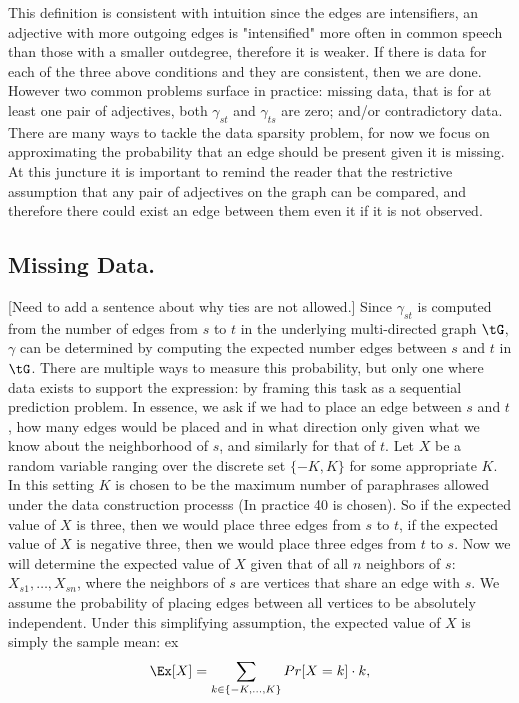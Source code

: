 This definition is consistent with intuition since the edges are intensifiers, an adjective with more outgoing edges is "intensified" more often in common speech than those with a smaller outdegree, therefore it is weaker. If there is data for each of the three above conditions and they are consistent, then we are done. However two common problems surface in practice: missing data, that is for at least one pair of adjectives, both $\gamma_{st}$ and $\gamma_{ts}$ are zero; and/or contradictory data. There are many ways to tackle the data sparsity problem, for now we focus on approximating the probability that an edge should be present given it is missing. At this juncture it is important to remind the reader that the restrictive assumption that any pair of adjectives on the graph can be compared, and therefore there could exist an edge between them even it if it is not observed.

\subsection{Missing Data.}

[Need to add a sentence about why ties are not allowed.] Since $\gamma_{st}$ is computed from the number of edges from $s$ to $t$ in the underlying multi-directed graph $\tG$, $\gamma$ can be determined by computing the expected number edges between $s$ and $t$ in $\tG$. There are multiple ways to measure this probability, but only one where data exists to support the expression: by framing this task as a sequential prediction problem. In essence, we ask if we had to place an edge between $s$ and $t$, how many edges would be placed and in what direction only given what we know about the neighborhood of $s$, and similarly for that of $t$. Let $X$ be a random variable ranging over the discrete set $\{-K, K\}$ for some appropriate $K$. In this setting $K$ is chosen to be the maximum number of paraphrases allowed under the data construction processs (In practice 40 is chosen). So if the expected value of $X$ is three, then we would place three edges from $s$ to $t$, if the expected value of $X$ is negative three, then we would place three edges from $t$ to $s$. Now we will determine the expected value of $X$ given that of all $n$ neighbors of $s$: $X_{s1}, \ldots, X_{sn}$, where the neighbors of $s$ are vertices that share an edge with $s$. We assume the probability of placing edges between all vertices to be absolutely independent. Under this simplifying assumption, the expected value of $X$ is simply the sample mean:
ex
\begin{equation}
	\Ex[X ] = \sum_{k \in \{-K,\ldots,K\}} Pr[X = k] \cdot k,
\end{equation}

